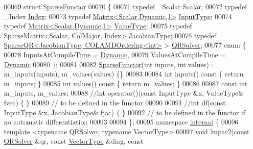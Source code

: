 \begin{DoxyCode}
\hyperlink{struct_eigen_1_1_sparse_functor}{00069} \textcolor{keyword}{struct }\hyperlink{struct_eigen_1_1_sparse_functor}{SparseFunctor}
00070 \{
00071   \textcolor{keyword}{typedef} \_Scalar Scalar;
00072   \textcolor{keyword}{typedef} \_Index \hyperlink{namespace_eigen_a62e77e0933482dafde8fe197d9a2cfde}{Index};
00073   \textcolor{keyword}{typedef} \hyperlink{group___core___module}{Matrix<Scalar,Dynamic,1>} \hyperlink{group___core___module}{InputType};
00074   \textcolor{keyword}{typedef} \hyperlink{group___core___module}{Matrix<Scalar,Dynamic,1>} \hyperlink{group___core___module}{ValueType};
00075   \textcolor{keyword}{typedef} \hyperlink{group___sparse_core___module_class_eigen_1_1_sparse_matrix}{SparseMatrix<Scalar, ColMajor, Index>} 
      \hyperlink{group___sparse_core___module_class_eigen_1_1_sparse_matrix}{JacobianType};
00076   \textcolor{keyword}{typedef} \hyperlink{group___sparse_q_r___module_class_eigen_1_1_sparse_q_r}{SparseQR<JacobianType, COLAMDOrdering<int>} > 
      \hyperlink{group___sparse_q_r___module_class_eigen_1_1_sparse_q_r}{QRSolver};
00077   \textcolor{keyword}{enum} \{
00078     InputsAtCompileTime = \hyperlink{namespace_eigen_ad81fa7195215a0ce30017dfac309f0b2}{Dynamic},
00079     ValuesAtCompileTime = \hyperlink{namespace_eigen_ad81fa7195215a0ce30017dfac309f0b2}{Dynamic}
00080   \};
00081   
00082   \hyperlink{struct_eigen_1_1_sparse_functor}{SparseFunctor}(\textcolor{keywordtype}{int} inputs, \textcolor{keywordtype}{int} values) : m\_inputs(inputs), m\_values(values) \{\}
00083 
00084   \textcolor{keywordtype}{int} inputs()\textcolor{keyword}{ const }\{ \textcolor{keywordflow}{return} m\_inputs; \}
00085   \textcolor{keywordtype}{int} values()\textcolor{keyword}{ const }\{ \textcolor{keywordflow}{return} m\_values; \}
00086   
00087   \textcolor{keyword}{const} \textcolor{keywordtype}{int} m\_inputs, m\_values;
00088   \textcolor{comment}{//int operator()(const InputType &x, ValueType& fvec) \{ \}}
00089   \textcolor{comment}{// to be defined in the functor}
00090   
00091   \textcolor{comment}{//int df(const InputType &x, JacobianType& fjac) \{ \}}
00092   \textcolor{comment}{// to be defined in the functor if no automatic differentiation}
00093   
00094 \};
00095 \textcolor{keyword}{namespace }\hyperlink{namespaceinternal}{internal} \{
00096 \textcolor{keyword}{template} <\textcolor{keyword}{typename} QRSolver, \textcolor{keyword}{typename} VectorType>
00097 \textcolor{keywordtype}{void} lmpar2(\textcolor{keyword}{const} \hyperlink{group___sparse_q_r___module_class_eigen_1_1_sparse_q_r}{QRSolver} &qr, \textcolor{keyword}{const} \hyperlink{struct_vector_type}{VectorType}  &diag, \textcolor{keyword}{const} 

\end{DoxyCode}
